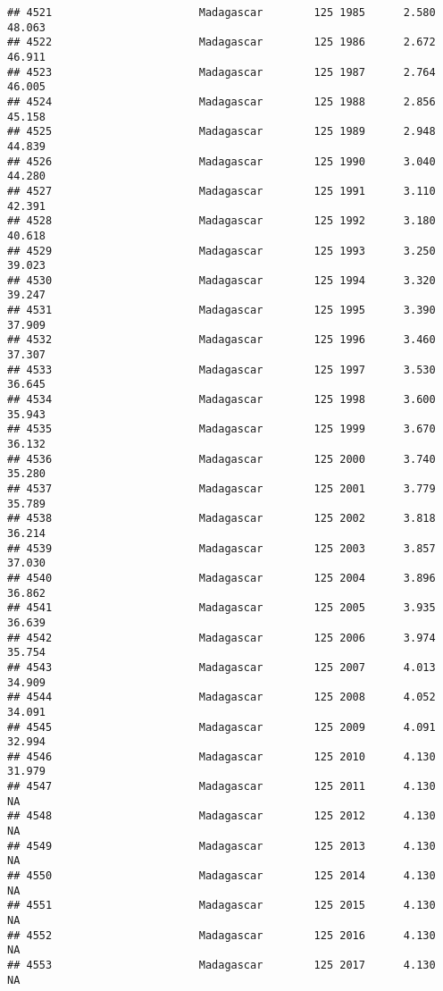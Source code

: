 \documentclass[
]{article}
\begin{document}
\begin{verbatim}
## 4521                       Madagascar        125 1985      2.580     48.063
## 4522                       Madagascar        125 1986      2.672     46.911
## 4523                       Madagascar        125 1987      2.764     46.005
## 4524                       Madagascar        125 1988      2.856     45.158
## 4525                       Madagascar        125 1989      2.948     44.839
## 4526                       Madagascar        125 1990      3.040     44.280
## 4527                       Madagascar        125 1991      3.110     42.391
## 4528                       Madagascar        125 1992      3.180     40.618
## 4529                       Madagascar        125 1993      3.250     39.023
## 4530                       Madagascar        125 1994      3.320     39.247
## 4531                       Madagascar        125 1995      3.390     37.909
## 4532                       Madagascar        125 1996      3.460     37.307
## 4533                       Madagascar        125 1997      3.530     36.645
## 4534                       Madagascar        125 1998      3.600     35.943
## 4535                       Madagascar        125 1999      3.670     36.132
## 4536                       Madagascar        125 2000      3.740     35.280
## 4537                       Madagascar        125 2001      3.779     35.789
## 4538                       Madagascar        125 2002      3.818     36.214
## 4539                       Madagascar        125 2003      3.857     37.030
## 4540                       Madagascar        125 2004      3.896     36.862
## 4541                       Madagascar        125 2005      3.935     36.639
## 4542                       Madagascar        125 2006      3.974     35.754
## 4543                       Madagascar        125 2007      4.013     34.909
## 4544                       Madagascar        125 2008      4.052     34.091
## 4545                       Madagascar        125 2009      4.091     32.994
## 4546                       Madagascar        125 2010      4.130     31.979
## 4547                       Madagascar        125 2011      4.130         NA
## 4548                       Madagascar        125 2012      4.130         NA
## 4549                       Madagascar        125 2013      4.130         NA
## 4550                       Madagascar        125 2014      4.130         NA
## 4551                       Madagascar        125 2015      4.130         NA
## 4552                       Madagascar        125 2016      4.130         NA
## 4553                       Madagascar        125 2017      4.130         NA

\end{verbatim}
\end{document}
